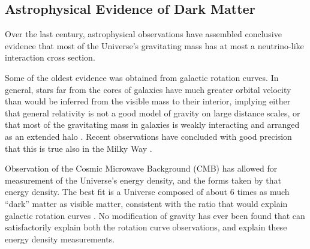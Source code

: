   \subsection{Astrophysical Evidence of Dark Matter} \label{sec:DMevidence}

  Over the last century, astrophysical observations have assembled conclusive evidence that most of the Universe's gravitating mass has at most a neutrino-like interaction cross section.

  Some of the oldest evidence was obtained from galactic rotation curves.
  In general, stars far from the cores of galaxies have much greater orbital velocity than would be inferred from the visible mass to their interior, implying either that general relativity is not a good model of gravity on large distance scales, or that most of the gravitating mass in galaxies is weakly interacting and arranged as an extended halo \cite{rotationcurves}.
  Recent observations have concluded with good precision that this is true also in the Milky Way \cite{rotationcurves_MW}.

  Observation of the Cosmic Microwave Background (CMB) has allowed for measurement of the Universe's energy density, and the forms taken by that energy density.
  The best fit is a Universe composed of about 6 times as much ``dark'' matter as visible matter, consistent with the ratio that would explain galactic rotation curves \cite{planckCMB}.
  No modification of gravity has ever been found that can satisfactorily explain both the rotation curve observations, and explain these energy density measurements.

